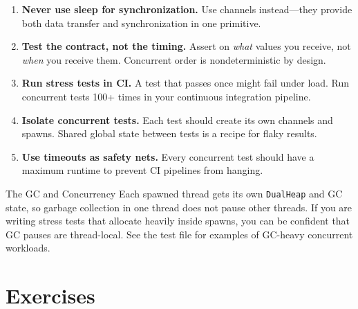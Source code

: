 \begin{enumerate}
  \item \textbf{Never use sleep for synchronization.} Use channels instead---they provide both data transfer and synchronization in one primitive.
  \item \textbf{Test the contract, not the timing.} Assert on \emph{what} values you receive, not \emph{when} you receive them. Concurrent order is nondeterministic by design.
  \item \textbf{Run stress tests in CI.} A test that passes once might fail under load. Run concurrent tests 100+ times in your continuous integration pipeline.
  \item \textbf{Isolate concurrent tests.} Each test should create its own channels and spawns. Shared global state between tests is a recipe for flaky results.
  \item \textbf{Use timeouts as safety nets.} Every concurrent test should have a maximum runtime to prevent CI pipelines from hanging.
\end{enumerate}

\begin{tipbox}{The GC and Concurrency}
Each spawned thread gets its own \texttt{DualHeap} and GC state, so garbage collection in one thread does not pause other threads.
If you are writing stress tests that allocate heavily inside spawns, you can be confident that GC pauses are thread-local.
See the test file  for examples of GC-heavy concurrent workloads.
\end{tipbox}

\section{Exercises}\label{sec:ch21-exercises}

